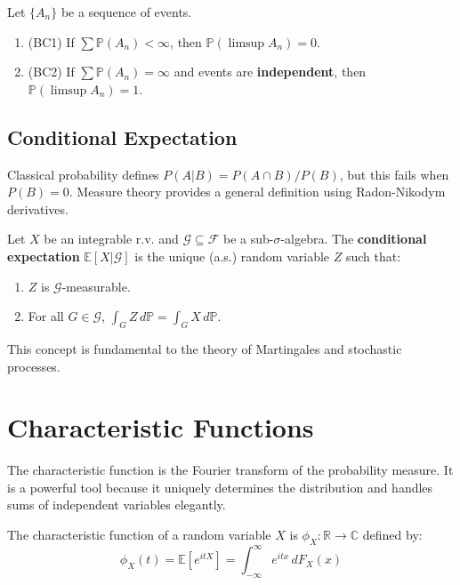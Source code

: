 \begin{theorem}
Let $\{A_n\}$ be a sequence of events.
\begin{enumerate}
    \item (BC1) If $\sum \mathbb{P}(A_n) < \infty$, then $\mathbb{P}(\limsup A_n) = 0$.
    \item (BC2) If $\sum \mathbb{P}(A_n) = \infty$ and events are \textbf{independent}, then $\mathbb{P}(\limsup A_n) = 1$.
\end{enumerate}
\end{theorem}

\subsection{Conditional Expectation}

Classical probability defines $P(A|B) = P(A \cap B)/P(B)$, but this fails when $P(B)=0$. Measure theory provides a general definition using Radon-Nikodym derivatives.

\begin{definition}
Let $X$ be an integrable r.v. and $\mathcal{G} \subseteq \mathcal{F}$ be a sub-$\sigma$-algebra. The \textbf{conditional expectation} $\mathbb{E}[X|\mathcal{G}]$ is the unique (a.s.) random variable $Z$ such that:
\begin{enumerate}
    \item $Z$ is $\mathcal{G}$-measurable.
    \item For all $G \in \mathcal{G}$, $\int_G Z \, d\mathbb{P} = \int_G X \, d\mathbb{P}$.
\end{enumerate}
\end{definition}
This concept is fundamental to the theory of Martingales and stochastic processes.

\section{Characteristic Functions}

The characteristic function is the Fourier transform of the probability measure. It is a powerful tool because it uniquely determines the distribution and handles sums of independent variables elegantly.

\begin{definition}
The characteristic function of a random variable $X$ is $\phi_X: \mathbb{R} \to \mathbb{C}$ defined by:
\[ \phi_X(t) = \mathbb{E}[e^{itX}] = \int_{-\infty}^\infty e^{itx} \, dF_X(x) \]
\end{definition}

